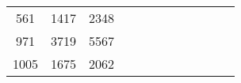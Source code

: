\begin{table}[tb]
\begin{tabular}{|c|c|c|ccccccccc}
		561  & 1417 & 2348 &                           &                           &                           &                           &                           &                           &                           &                           &                           \\ \cline{1-3}
		971  & 3719 & 5567 &                           &                           &                           &                           &                           &                           &                           &                           &                           \\ \cline{1-3}
		1005 & 1675 & 2062 &                           &                           &                           &                           &                           &                           &                           &                           &                           \\ \cline{1-3}
	\end{tabular}
	
	
\end{table}

